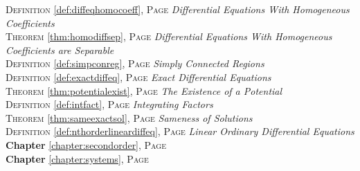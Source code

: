 \begin{multicols}{2}
{\textsc{Definition} \ref{def:diffeqhomocoeff}, \textsc{Page} \pageref{def:diffeqhomocoeff} \textit{Differential Equations With Homogeneous Coefficients} \\
\textsc{Theorem} \ref{thm:homodiffsep}, \textsc{Page} \pageref{thm:homodiffsep} \textit{Differential Equations With Homogeneous Coefficients are Separable} \\
\textsc{Definition} \ref{def:simpconreg}, \textsc{Page} \pageref{def:simpconreg} \textit{Simply Connected Regions} \\
\textsc{Definition} \ref{def:exactdiffeq}, \textsc{Page} \pageref{def:exactdiffeq} \textit{Exact Differential Equations} \\
\textsc{Theorem} \ref{thm:potentialexist}, \textsc{Page} \pageref{thm:potentialexist} \textit{The Existence of a Potential} \\
\textsc{Definition} \ref{def:intfact}, \textsc{Page} \pageref{def:intfact} \textit{Integrating Factors} \\
\textsc{Theorem} \ref{thm:sameexactsol}, \textsc{Page} \pageref{thm:sameexactsol} \textit{Sameness of Solutions} \\
\textsc{Definition} \ref{def:nthorderlineardiffeq}, \textsc{Page} \pageref{def:nthorderlineardiffeq} \textit{Linear Ordinary Differential Equations} \\
\textbf{Chapter} \ref{chapter:secondorder}, \textsc{Page} \pageref{chapter:secondorder} \\
\textbf{Chapter} \ref{chapter:systems}, \textsc{Page} \pageref{chapter:systems} \\

      }
\end{multicols}

